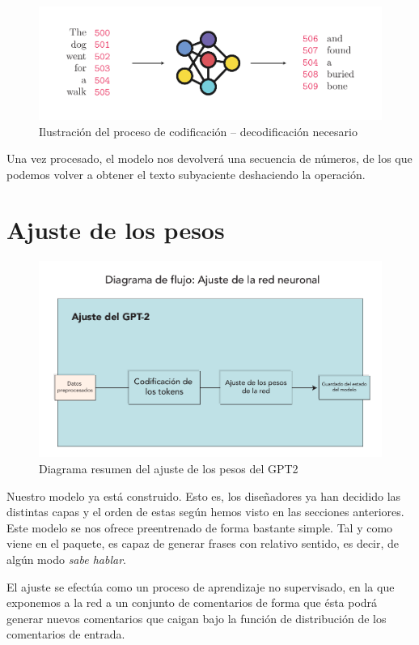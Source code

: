 \begin{figure}[h]
	\centering
	\includegraphics[width=.9\textwidth]{media/tokenizer.pdf}
	\caption{Ilustración del proceso de codificación -- decodificación necesario}
	\label{fig:codification}
\end{figure}

Una vez procesado, el modelo nos devolverá una secuencia de números, de los que podemos volver a obtener el texto subyaciente deshaciendo la operación.




\section{Ajuste de los pesos}
\begin{figure}[h]
	\centering
	\includegraphics[width=.9\textwidth]{media/gpt-fine-tune.pdf}
	\caption{Diagrama resumen del ajuste de los pesos del GPT2}
	\label{fig:fine-tune-gpt}
\end{figure}

Nuestro modelo ya está construido. Esto es, los diseñadores ya han decidido las distintas capas y el orden de estas según hemos visto en las secciones anteriores. Este modelo se nos ofrece preentrenado de forma bastante simple. Tal y como viene en el paquete, es capaz de generar frases con relativo sentido, es decir, de algún modo \textit{sabe hablar}. 

El ajuste se efectúa como un proceso de aprendizaje no supervisado, en la que exponemos a la red a un conjunto de comentarios de forma que ésta podrá generar nuevos comentarios que caigan bajo la función de distribución de los comentarios de entrada. 

